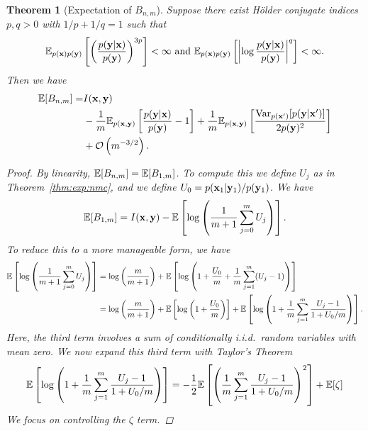 \documentclass[a4paper, 10pt]{report}
\theoremstyle{plain}
\newtheorem{theorem}{Theorem}[chapter]
\begin{document}
	\begin{theorem}[Expectation of $B_{n,m}$]\label{thm:exp:pce}
		Suppose there exist H\"{o}lder conjugate indices $p,q>0$ with $1/p + 1/q=1$ such that
		\begin{equation}
		\mathbb{E}_{p({\mathbf{x}})p({\mathbf{y}})}\left[\left(\frac{p({\mathbf{y}}|{\mathbf{x}})}{p({\mathbf{y}})}\right)^{3p} \right]<\infty \text{  and  } \mathbb{E}_{p({\mathbf{x}})p({\mathbf{y}})}\left[\left|  \log \frac{p({\mathbf{y}}|{\mathbf{x}})}{p({\mathbf{y}})} \right|^q\right]<\infty.
		\end{equation}
		Then we have
		\begin{equation}
		\begin{split}
		\mathbb{E}[B_{n,m}] =& I({\mathbf{x}},{\mathbf{y}}) \\
		& - \frac{1}{m}\mathbb{E}_{p({\mathbf{x}},{\mathbf{y}})}\left[ \frac{p({\mathbf{y}}|{\mathbf{x}})}{p({\mathbf{y}})} - 1 \right] +  \frac{1}{m}\mathbb{E}_{p({\mathbf{x}},{\mathbf{y}})}\left[ \frac{\mathrm{Var}_{p({\mathbf{x}}')}[p({\mathbf{y}}|{\mathbf{x}}')]}{2p({\mathbf{y}})^2} \right] \\
		& + \mathcal{O}\left( m^{-3/2} \right).
		\end{split}
		\end{equation}
		\begin{proof}
			By linearity, $\mathbb{E}[B_{n,m}] = \mathbb{E}[B_{1,m}]$. To compute this we define $U_j$ as in Theorem~\ref{thm:exp:nmc}, and we define $U_0 = p({\mathbf{x}}_1|{\mathbf{y}}_1)/p({\mathbf{y}}_1)$.
			We have
			\begin{equation}
			\mathbb{E}[B_{1,m}] = I({\mathbf{x}},{\mathbf{y}}) - \mathbb{E}\left[ \log \left(\frac{1}{m+1}\sum_{j=0}^m U_j \right) \right].
			\end{equation}
			To reduce this to a more manageable form, we have
			\begin{align}
			\mathbb{E}\left[ \log \left(\frac{1}{m+1}\sum_{j=0}^m U_j \right) \right] &= \log\left(\frac{m}{m+1}\right)+ \mathbb{E}\left[ \log \left(1 + \frac{U_0}{m}+\frac{1}{m}\sum_{j=1}^m (U_j-1) \right) \right] \\
			&=  \log\left(\frac{m}{m+1}\right) + \mathbb{E}\left[\log\left(1 + \frac{U_0}{m} \right) \right] + \mathbb{E}\left[ \log \left(1 + \frac{1}{m}\sum_{j=1}^m \frac{U_j-1}{1 + U_0/m} \right) \right].
			\end{align}
			Here, the third term involves a sum of conditionally i.i.d.~random variables with mean zero.
			We now expand this third term with Taylor's Theorem
			\begin{equation}
			\mathbb{E}\left[ \log \left(1 + \frac{1}{m}\sum_{j=1}^m \frac{U_j-1}{1 + U_0/m} \right) \right] = -\frac{1}{2}\mathbb{E}\left[ \left(\frac{1}{m}\sum_{j=1}^m \frac{U_j - 1}{1 + U_0 / m}\right)^2 \right] + \mathbb{E}[\zeta]
			\end{equation}
			We focus on controlling the $\zeta$ term.

\end{proof}
\end{theorem}
\end{document}
